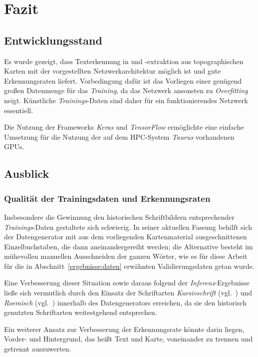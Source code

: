 \section{Fazit}

\subsection{Entwicklungsstand}

Es wurde gezeigt, dass Texterkennung in und -extraktion aus topographischen Karten mit der vorgestellten
Netzwerkarchitektur möglich ist und gute Erkennungsraten liefert. Vorbedingung dafür ist das Vorliegen einer genügend
großen Datenmenge für das \textit{Training}, da das Netzwerk ansonsten zu \textit{Overfitting} neigt. Künstliche
\textit{Trainings}-Daten sind daher für ein funktionierendes Netzwerk essentiell.

Die Nutzung der Frameworks \textit{Keras} und \textit{TensorFlow} ermöglichte eine einfache Umsetzung für die Nutzung
der auf dem HPC-System \textit{Taurus} vorhandenen GPUs.

\subsection{Ausblick}

\subsubsection{Qualität der Trainingsdaten und Erkennungsraten}

Insbesondere die Gewinnung den historischen Schriftbildern entsprechender \textit{Trainings}-Daten gestaltete sich
schwierig. In seiner aktuellen Fassung behilft sich der Datengenerator mit aus dem vorliegenden Kartenmaterial
ausgeschnittenen Einzelbuchstaben, die dann aneinandergereiht werden; die Alternative besteht im mühevollen manuellen
Ausschneiden der ganzen Wörter, wie es für diese Arbeit für die in Abschnitt~\ref{ergebnisse:daten} erwähnten
Validierungsdaten getan wurde.

Eine Verbesserung dieser Situation sowie daraus folgend der \textit{Inferenz}-Ergebnisse ließe sich vermutlich durch
den Einsatz der Schriftarten \textit{Kursivschrift} (vgl.~\cite{kursivschrift}) und \textit{Roemisch}
(vgl.~\cite{roemisch}) innerhalb des Datengenerators erreichen, da sie den historisch genutzten Schriftarten
weitestgehend entsprechen.

Ein weiterer Ansatz zur Verbesserung der Erkennungsrate könnte darin liegen, Vorder- und Hintergrund, das heißt Text
und Karte, voneinander zu trennen und getrennt auszuwerten.

